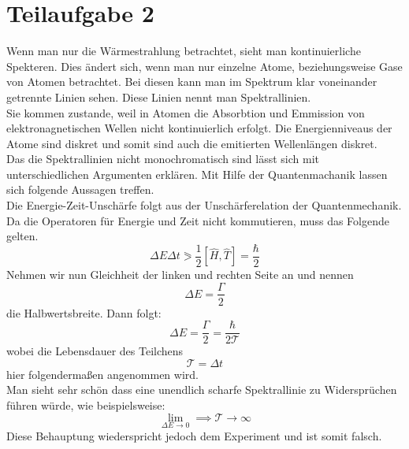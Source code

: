 

\section{Teilaufgabe 2}

Wenn man nur die Wärmestrahlung betrachtet, sieht man kontinuierliche Spekteren. Dies ändert sich, wenn man nur einzelne Atome, beziehungsweise Gase von Atomen betrachtet.
 Bei diesen kann man im
Spektrum klar voneinander getrennte Linien sehen. Diese Linien nennt man Spektrallinien.\\
Sie kommen zustande, weil in Atomen die Absorbtion und Emmission von elektronagnetischen Wellen nicht kontinuierlich erfolgt. Die Energienniveaus der Atome sind diskret und 
somit sind auch die emitierten Wellenlängen diskret.\\
Das die Spektrallinien nicht monochromatisch sind lässt sich mit unterschiedlichen Argumenten erklären. Mit Hilfe der Quantenmachanik lassen sich folgende Aussagen treffen.\\
Die Energie-Zeit-Unschärfe folgt aus der Unschärferelation der Quantenmechanik. Da die Operatoren für Energie und Zeit nicht kommutieren, muss das Folgende gelten.\\
\begin{equation}
    \Delta E  \Delta t \eqslantgtr \frac{1}{2} [ \hat{H},\hat{T}] =  \frac{\hbar }{2} 
\end{equation}
Nehmen wir nun Gleichheit der linken und rechten Seite an und nennen $$ \Delta E =\frac{\Gamma}{2}$$ die Halbwertsbreite. Dann folgt:\\
\begin{equation}
    \Delta E =\frac{\Gamma}{2} = \frac{\hbar }{2\mathcal{T} } 
\end{equation}
wobei die Lebensdauer des Teilchens $$\mathcal{T} = \Delta t$$ hier folgendermaßen angenommen wird.\\
Man sieht sehr schön dass eine unendlich scharfe Spektrallinie zu Widersprüchen führen würde, wie beispielsweise:
\begin{equation}
    \lim_{\Delta E \to 0}  \implies \mathcal{T} \longrightarrow \infty 
\end{equation}
Diese Behauptung wiederspricht jedoch dem Experiment und ist somit falsch.